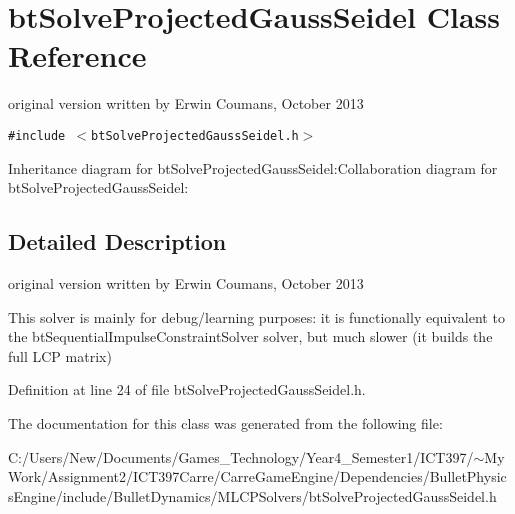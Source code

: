 \hypertarget{classbt_solve_projected_gauss_seidel}{
\section{btSolveProjectedGaussSeidel Class Reference}
\label{classbt_solve_projected_gauss_seidel}
}
original version written by Erwin Coumans, October 2013  


{\tt \#include $<$btSolveProjectedGaussSeidel.h$>$}

Inheritance diagram for btSolveProjectedGaussSeidel:Collaboration diagram for btSolveProjectedGaussSeidel:

\subsection{Detailed Description}
original version written by Erwin Coumans, October 2013 

This solver is mainly for debug/learning purposes: it is functionally equivalent to the btSequentialImpulseConstraintSolver solver, but much slower (it builds the full LCP matrix) 

Definition at line 24 of file btSolveProjectedGaussSeidel.h.

The documentation for this class was generated from the following file:\begin{CompactItemize}
\item 
C:/Users/New/Documents/Games\_\-Technology/Year4\_\-Semester1/ICT397/$\sim$My Work/Assignment2/ICT397Carre/CarreGameEngine/Dependencies/BulletPhysicsEngine/include/BulletDynamics/MLCPSolvers/btSolveProjectedGaussSeidel.h\end{CompactItemize}
